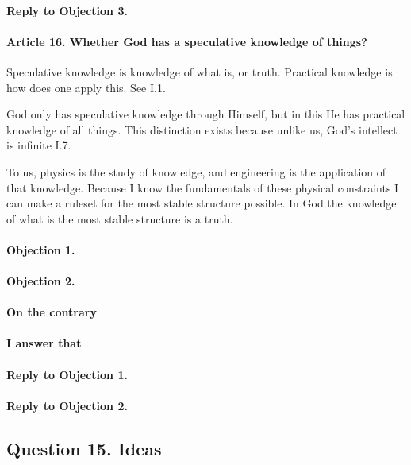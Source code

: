 \documentclass{ucetd}
\begin{document}
\paragraph{Reply to Objection 3.}

\paragraph{Article 16. Whether God has a speculative knowledge of things?}
Speculative knowledge is knowledge of what is, or truth. Practical knowledge is how does one apply this. See I.1.

God only has speculative knowledge through Himself, but in this He has practical knowledge of all things. This distinction exists because unlike us, God's intellect is infinite I.7.

To us, physics is the study of knowledge, and engineering is the application of that knowledge. Because I know the fundamentals of these physical constraints I can make a ruleset for the most stable structure possible. In God the knowledge of what is the most stable structure is a truth.
\paragraph{Objection 1.}
\paragraph{Objection 2.}
\paragraph{On the contrary}
\paragraph{I answer that}
\paragraph{Reply to Objection 1.}
\paragraph{Reply to Objection 2.}


\subsection{Question 15. Ideas}
\end{document}
